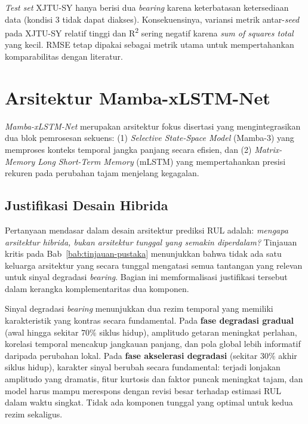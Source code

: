 \emph{Test set} XJTU-SY hanya berisi dua \emph{bearing} karena keterbatasan
ketersediaan data (kondisi 3 tidak dapat diakses).
Konsekuensinya, variansi metrik antar-\emph{seed} pada XJTU-SY relatif
tinggi dan R\textsuperscript{2} sering negatif karena \emph{sum of
squares total} yang kecil.
RMSE tetap dipakai sebagai metrik utama untuk mempertahankan
komparabilitas dengan literatur.

\section{Arsitektur Mamba-xLSTM-Net}
\label{sec:bab4_arsitektur}

\emph{Mamba-xLSTM-Net} merupakan arsitektur fokus disertasi yang
mengintegrasikan dua blok pemrosesan sekuens: (1) \emph{Selective
State-Space Model} (Mamba-3) yang memproses konteks temporal jangka
panjang secara efisien, dan (2) \emph{Matrix-Memory Long Short-Term
Memory} (mLSTM) yang mempertahankan presisi rekuren pada perubahan
tajam menjelang kegagalan.

\subsection{Justifikasi Desain Hibrida}
\label{subsec:bab4_justifikasi}

Pertanyaan mendasar dalam desain arsitektur prediksi RUL adalah: \emph{mengapa
arsitektur hibrida, bukan arsitektur tunggal yang semakin diperdalam?} Tinjauan
kritis pada Bab~\ref{bab:tinjauan-pustaka}
menunjukkan bahwa tidak ada satu keluarga arsitektur yang secara tunggal mengatasi
semua tantangan yang relevan untuk sinyal degradasi \emph{bearing}. Bagian ini
memformalisasi justifikasi tersebut dalam kerangka komplementaritas dua komponen.

Sinyal degradasi \emph{bearing} menunjukkan dua rezim temporal yang memiliki karakteristik
yang kontras secara fundamental. Pada \textbf{fase degradasi gradual} (awal hingga
sekitar $70\%$ siklus hidup), amplitudo getaran meningkat perlahan, korelasi
temporal mencakup jangkauan panjang, dan pola global lebih informatif daripada
perubahan lokal. Pada \textbf{fase akselerasi degradasi} (sekitar $30\%$ akhir
siklus hidup), karakter sinyal berubah secara fundamental: terjadi lonjakan
amplitudo yang dramatis, fitur kurtosis dan faktor puncak meningkat tajam, dan
model harus mampu merespons dengan revisi besar terhadap estimasi RUL dalam
waktu singkat. Tidak ada komponen tunggal yang optimal untuk kedua rezim
sekaligus.

